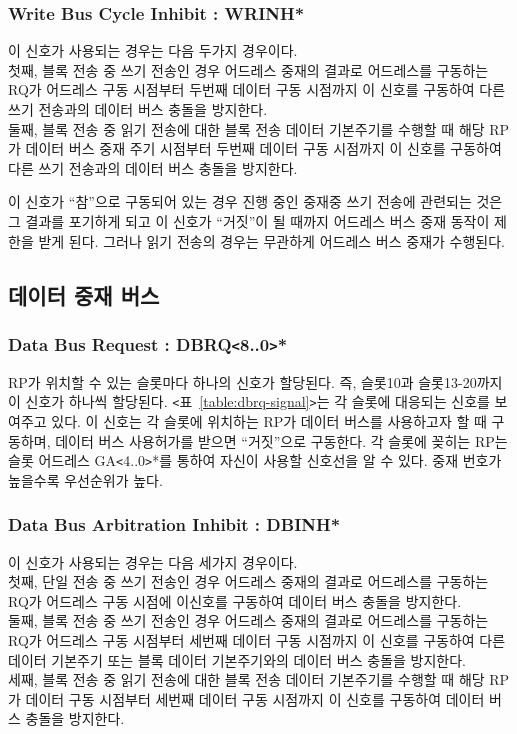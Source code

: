 \subsubsection{Write Bus Cycle Inhibit : WRINH*}
이 신호가 사용되는 경우는 다음 두가지 경우이다. \\
첫째, 블록 전송 중 쓰기 전송인 경우 어드레스 중재의 결과로 어드레스를 구동하는 RQ가
어드레스 구동 시점부터 두번째 데이터 구동 시점까지 이 신호를 구동하여 다른 쓰기 전송과의
데이터 버스 충돌을 방지한다. \\
둘째, 블록 전송 중 읽기 전송에 대한 블록 전송 데이터 기본주기를 수행할 때 해당 RP가
데이터 버스 중재 주기 시점부터 두번째 데이터 구동 시점까지 이 신호를 구동하여
다른 쓰기 전송과의 데이터 버스 충돌을 방지한다.

이 신호가 ``참''으로 구동되어 있는 경우 진행 중인 중재중 쓰기 전송에 관련되는 것은
그 결과를 포기하게 되고 이 신호가 ``거짓''이 될 때까지 어드레스 버스 중재 동작이
제한을 받게 된다. 그러나 읽기 전송의 경우는 무관하게 어드레스 버스 중재가 수행된다.
%
\subsection{데이터 중재 버스}
%
\subsubsection{Data Bus Request : DBRQ{\tt <}8..0{\tt >}*}
RP가 위치할 수 있는 슬롯마다 하나의 신호가 할당된다. 즉, 슬롯10과 슬롯13-20까지
이 신호가 하나씩 할당된다. {\tt <}표~\ref{table:dbrq-signal}{\tt >}는
각 슬롯에 대응되는 신호를 보여주고 있다.
이 신호는 각 슬롯에 위치하는 RP가 데이터 버스를
사용하고자 할 때 구동하며, 데이터 버스 사용허가를 받으면 ``거짓''으로 구동한다.
각 슬롯에 꽂히는 RP는 슬롯 어드레스 GA{\tt <}4..0{\tt >}*를 통하여 자신이 
사용할 신호선을 알 수 있다.
중재 번호가 높을수록 우선순위가 높다.
%

%
\subsubsection{Data Bus Arbitration Inhibit : DBINH*}
이 신호가 사용되는 경우는 다음 세가지 경우이다. \\
첫째, 단일 전송 중 쓰기 전송인 경우 어드레스 중재의 결과로 어드레스를 구동하는
RQ가 어드레스 구동 시점에 이신호를 구동하여 데이터 버스 충돌을 방지한다.\\
둘째, 블록 전송 중 쓰기 전송인 경우 어드레스 중재의 결과로 어드레스를 구동하는
RQ가 어드레스 구동 시점부터 세번째 데이터 구동 시점까지 이 신호를 구동하여 다른 데이터
기본주기 또는 블록 데이터 기본주기와의 데이터 버스 충돌을 방지한다. \\
세째, 블록 전송 중 읽기 전송에 대한 블록 전송 데이터 기본주기를 수행할 때 해당
RP가 데이터 구동 시점부터 세번째 데이터 구동 시점까지 이 신호를 구동하여 데이터
버스 충돌을 방지한다.

